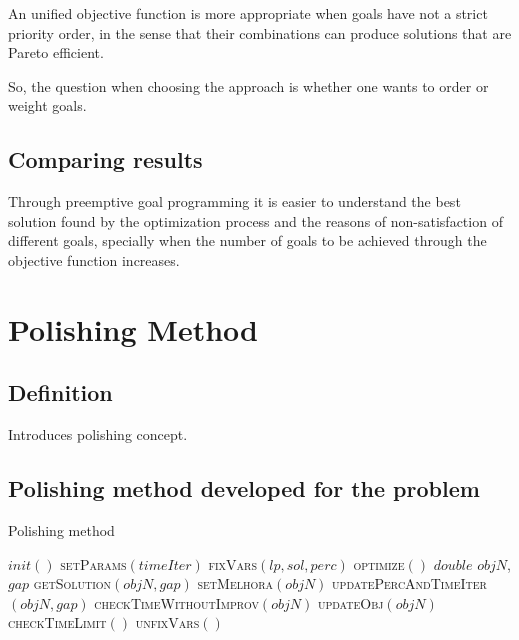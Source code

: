 An unified objective function is more appropriate when goals have not a strict priority order, in the sense that their combinations can produce solutions that are Pareto efficient.

So, the question when choosing the approach is whether one wants to order or weight goals.


\subsection{Comparing results}

Through preemptive goal programming it is easier to understand the best solution found by the optimization process and the reasons of non-satisfaction of different goals, specially when the number of goals to be achieved through the objective function increases.





\section{Polishing Method}

\subsection{Definition}

Introduces polishing concept.

\subsection{Polishing method developed for the problem}

\begin{algorithm}
  \caption{Polishing method
    \label{alg:polishing}}
  \begin{algorithmic}[1]
    \Statex
			\State $init()$
      \State \textsc{setParams}$(timeIter)$
          \State \textsc{fixVars}$(lp, sol, perc)$
					\State \textsc{optimize}$()$
					\State $double$ $objN$, $gap$
					\State \textsc{getSolution}$(objN, gap)$
					\State \textsc{setMelhora}$(objN)$
					\State \textsc{updatePercAndTimeIter}$(objN, gap)$
					\State \textsc{checkTimeWithoutImprov}$(objN)$
					\State \textsc{updateObj}$(objN)$
					\State \textsc{checkTimeLimit}$()$
					\State \textsc{unfixVars}$()$
      \EndWhile
     \State {}
    \EndFunction
  \end{algorithmic}
\end{algorithm}
		  	  

